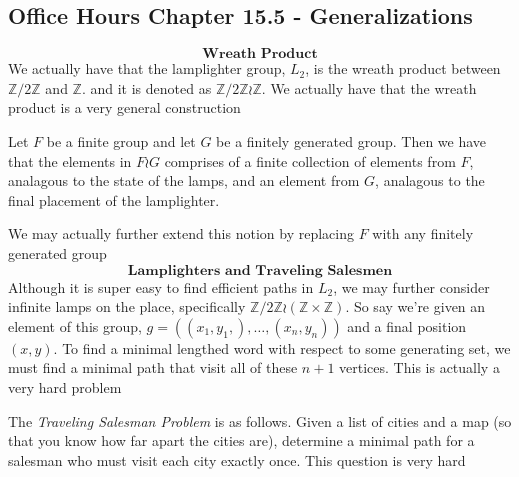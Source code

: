 \subsection{Office Hours Chapter 15.5 - Generalizations}
\[\textbf{Wreath Product}\]
We actually have that the lamplighter group, $L_2$, is the wreath product between $\mathbb{Z}/2\mathbb{Z}$ and $\mathbb{Z}$. and it is denoted as $\mathbb{Z}/2\mathbb{Z}\wr \mathbb{Z}$. We actually have that the wreath product is a very general construction
\begin{definition}
    Let $F$ be a finite group and let $G$ be a finitely generated group. Then we have that the elements in $F\wr G$ comprises of a finite collection of elements from $F$, analagous to the state of the lamps, and an element from $G$, analagous to the final placement of the lamplighter.
\end{definition}
We may actually further extend this notion by replacing $F$ with any finitely generated group
\[\textbf{Lamplighters and Traveling Salesmen}\]
Although it is super easy to find efficient paths in $L_2$, we may further consider infinite lamps on the place, specifically $\mathbb{Z}/2\mathbb{Z}\wr(\mathbb{Z}\times\mathbb{Z})$. So say we're given an element of this group, $g=((x_1,y_1,),\ldots,(x_n,y_n))$ and a final position $(x,y)$. To find a minimal lengthed word with respect to some generating set, we must find a minimal path that visit all of these $n+1$ vertices. This is actually a very hard problem
\begin{remark}
    The \textit{Traveling Salesman Problem} is as follows. Given a list of cities and a map (so that you know how far apart the cities are), determine a minimal path for a salesman who must visit each city exactly once. This question is very hard
\end{remark}